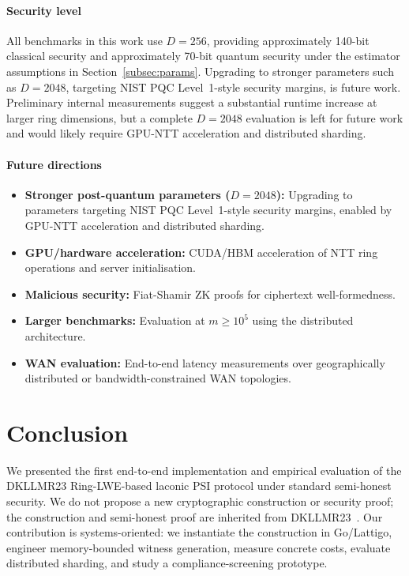 \documentclass[preprint,12pt]{elsarticle}
\begin{document}
\paragraph{Security level}
All benchmarks in this work use $D=256$, providing approximately
140-bit classical security and approximately 70-bit quantum security under
the estimator assumptions in Section~\ref{subsec:params}. Upgrading to
stronger parameters such as $D=2048$, targeting NIST PQC Level~1-style
security margins, is future work. Preliminary internal measurements suggest
a substantial runtime increase at larger ring dimensions, but a complete
$D=2048$ evaluation is left for future work and would likely require
GPU-NTT acceleration and distributed sharding.

\paragraph{Future directions}
\begin{itemize}[leftmargin=*]
  \item \textbf{Stronger post-quantum parameters ($D=2048$):} Upgrading to
        parameters targeting NIST PQC Level~1-style security margins, enabled
        by GPU-NTT acceleration and distributed sharding.
  \item \textbf{GPU/hardware acceleration:} CUDA/HBM acceleration of NTT ring
        operations and server initialisation.
  \item \textbf{Malicious security:} Fiat-Shamir ZK proofs for ciphertext
        well-formedness.
  \item \textbf{Larger benchmarks:} Evaluation at $m \geq 10^5$ using the
        distributed architecture.
  \item \textbf{WAN evaluation:} End-to-end latency measurements over
        geographically distributed or bandwidth-constrained WAN topologies.
\end{itemize}

\section{Conclusion}
\label{sec:conclusion}

We presented the first end-to-end implementation and
empirical evaluation of the DKLLMR23 Ring-LWE-based laconic PSI protocol
under standard semi-honest security. We do not propose a new cryptographic
construction or security proof; the construction and semi-honest proof are
inherited from DKLLMR23~\cite{dottling2023laconic}. Our contribution is
systems-oriented: we instantiate the construction in Go/Lattigo, engineer
memory-bounded witness generation, measure concrete costs, evaluate
distributed sharding, and study a compliance-screening prototype.
\end{document}
